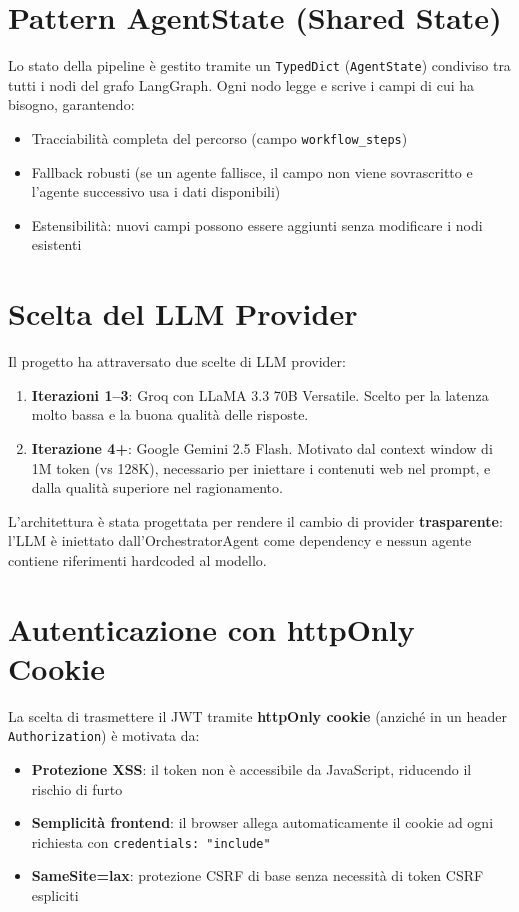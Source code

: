 \documentclass[a4paper,12pt]{report}
\begin{document}
\section{Pattern AgentState (Shared State)}

Lo stato della pipeline è gestito tramite un \texttt{TypedDict} (\texttt{AgentState}) condiviso tra tutti i nodi del grafo LangGraph. Ogni nodo legge e scrive i campi di cui ha bisogno, garantendo:
\begin{itemize}
    \item Tracciabilità completa del percorso (campo \texttt{workflow\_steps})
    \item Fallback robusti (se un agente fallisce, il campo non viene sovrascritto e l'agente successivo usa i dati disponibili)
    \item Estensibilità: nuovi campi possono essere aggiunti senza modificare i nodi esistenti
\end{itemize}

\section{Scelta del LLM Provider}

Il progetto ha attraversato due scelte di LLM provider:
\begin{enumerate}
    \item \textbf{Iterazioni 1--3}: Groq con LLaMA 3.3 70B Versatile. Scelto per la latenza molto bassa e la buona qualità delle risposte.
    \item \textbf{Iterazione 4+}: Google Gemini 2.5 Flash. Motivato dal context window di 1M token (vs 128K), necessario per iniettare i contenuti web nel prompt, e dalla qualità superiore nel ragionamento.
\end{enumerate}

L'architettura è stata progettata per rendere il cambio di provider \textbf{trasparente}: l'LLM è iniettato dall'OrchestratorAgent come dependency e nessun agente contiene riferimenti hardcoded al modello.

\section{Autenticazione con httpOnly Cookie}

La scelta di trasmettere il JWT tramite \textbf{httpOnly cookie} (anziché in un header \texttt{Authorization}) è motivata da:
\begin{itemize}
    \item \textbf{Protezione XSS}: il token non è accessibile da JavaScript, riducendo il rischio di furto
    \item \textbf{Semplicità frontend}: il browser allega automaticamente il cookie ad ogni richiesta con \texttt{credentials: "include"}
    \item \textbf{SameSite=lax}: protezione CSRF di base senza necessità di token CSRF espliciti
\end{itemize}
\end{document}

